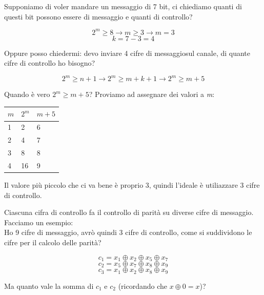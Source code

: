 Supponiamo di voler mandare un messaggio di 7 bit, ci chiediamo quanti di questi bit possono essere di messaggio e quanti di controllo?

\begin{equation*}
2^m \geq 8 \rightarrow m \geq 3 \rightarrow m=3
\end{equation*}
\begin{equation*}
k = 7 - 3 = 4
\end{equation*}

\newpage

Oppure posso chiedermi: devo inviare 4 cifre di messaggiosul canale, di quante cifre di controllo ho bisogno?

\begin{equation*}
2^m \geq n+1 \rightarrow 2^m \geq m+k+1 \rightarrow 2^m \geq m+5
\end{equation*}

Quando è vero $2^m \geq m+5$? Proviamo ad assegnare dei valori a \textit{m}:

\begin{table}[h]
	\centering
	\begin{tabular}{l|l|l}
		$m$ & $2^m$ & $m+5$ \\
		\hline
		1   & 2     & 6     \\
		2   & 4     & 7     \\
		3   & 8     & 8     \\
		4   & 16    & 9    
	\end{tabular}
\end{table}

Il valore più piccolo che ci va bene è proprio 3, quindi l'ideale è utiliazzare 3 cifre di controllo.

Ciascuna cifra di controllo fa il controllo di parità su diverse cifre di messaggio. Facciamo un esempio:\\
Ho 9 cifre di messaggio, avrò quindi 3 cifre di controllo, come si suddividono le cifre per il calcolo delle parità?


\begin{equation}
c_1 = x_1 \oplus x_2 \oplus x_5 \oplus x_7
\end{equation}
\begin{equation*}
c_2 = x_5 \oplus x_7 \oplus x_8 \oplus x_9
\end{equation*}
\begin{equation*}
c_3 = x_1 \oplus x_2 \oplus x_8 \oplus x_9
\end{equation*}

Ma quanto vale la somma di $c_1$ e $c_2$ (ricordando che $x \oplus 0 = x$)?

